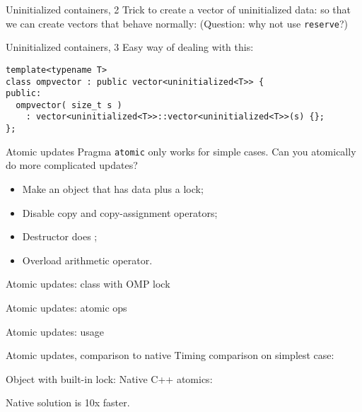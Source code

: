 \documentclass[10pt]{beamer}
\begin{document}
\begin{numberedframe}{Uninitialized containers, 2}
  Trick to create a vector of uninitialized data:
  so that we can create vectors that behave normally:
  (Question: why not use \lstinline{reserve}?)
\end{numberedframe}

\begin{numberedframe}{Uninitialized containers, 3}
  Easy way of dealing with this:
\begin{lstlisting}
template<typename T>
class ompvector : public vector<uninitialized<T>> {
public:
  ompvector( size_t s )
    : vector<uninitialized<T>>::vector<uninitialized<T>>(s) {};
};
\end{lstlisting}
\end{numberedframe}

\begin{numberedframe}{Atomic updates}
  Pragma \lstinline{atomic} only works for simple cases.
  Can you atomically do more complicated updates?
  \begin{itemize}
  \item Make an object that has data plus a lock;
  \item Disable copy and copy-assignment operators;
  \item Destructor does ;
  \item Overload arithmetic operator.
  \end{itemize}
\end{numberedframe}

\begin{numberedframe}{Atomic updates: class with OMP lock}
\end{numberedframe}

\begin{numberedframe}{Atomic updates: atomic ops}
\end{numberedframe}

\begin{numberedframe}{Atomic updates: usage}
\end{numberedframe}

\begin{numberedframe}{Atomic updates, comparison to native}
  Timing comparison on simplest case:
\begin{multicols}{2}
  \let\snippetoutputsize\scriptsize
  Object with built-in lock:
\columnbreak
Native C++ atomics:
\end{multicols}

  Native solution is 10x faster.

\end{numberedframe}
\end{document}
